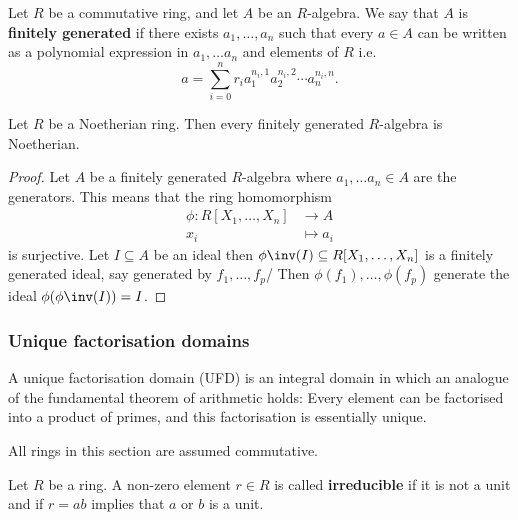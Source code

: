 \documentclass[12pt, a4paper]{article}
\begin{document}
\begin{definition}
    Let \(R\) be a commutative ring, and let \(A\) be an \(R\)-algebra. We say that \(A\) is \textbf{finitely generated} if there exists \(a_1,\ldots,a_n\) such that every \(a\in A\) can be written as a polynomial expression in \(a_1,\ldots a_n\) and elements of \(R\) i.e. 
    \[a=\sum_{i=0}^{n} r_i a_1^{n_i,1} a_2^{n_i,2} \cdots a_n^{n_i,n}.\]
\end{definition}

\begin{corollary}
    Let \(R\) be a Noetherian ring. Then every finitely generated \(R\)-algebra is Noetherian.
\end{corollary}

\begin{proof}
    Let \(A\) be a finitely generated \(R\)-algebra where \(a_1,\ldots a_n \in A\) are the generators. This means that the ring homomorphism
    \[\begin{aligned}
        \phi : R[X_1,\ldots,X_n] &\to A \\
        x_i &\mapsto a_i
    \end{aligned}\]
    is surjective. Let \(I \subseteq A\) be an ideal then \(\phi\inv(I) \subseteq R[X_1,\ldots,X_n]\) is a finitely generated ideal, say generated by \(f_1,\ldots,f_p\)/ Then \(\phi(f_1),\ldots,\phi(f_p)\) generate the ideal \(\phi(\phi\inv(I))=I\).
\end{proof}

\subsubsection{Unique factorisation domains}

\begin{mdnote}
    A unique factorisation domain (UFD) is an integral domain in which an analogue of the fundamental theorem of arithmetic holds: Every element can be factorised into a product of primes, and this factorisation is essentially unique. 
\end{mdnote}

\begin{mdremark}
    All rings in this section are assumed commutative.
\end{mdremark}

\begin{definition}
    Let \(R\) be a ring. A non-zero element \(r\in R\) is called \textbf{irreducible} if it is not a unit and if \(r=ab\) implies that \(a\) or \(b\) is a unit.
\end{definition}
\end{document}
